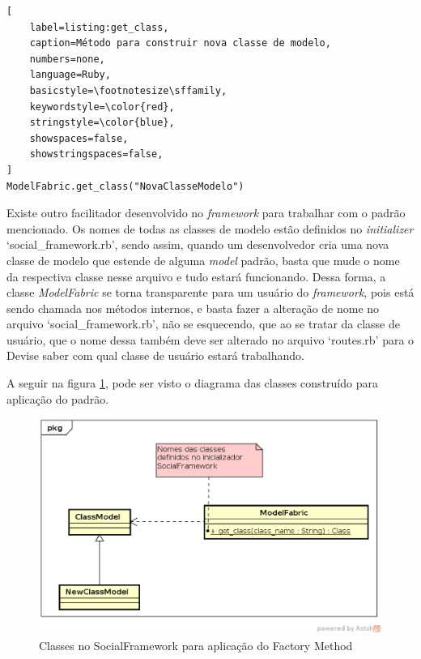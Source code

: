 \begin{lstlisting}[
    label=listing:get_class,
    caption=Método para construir nova classe de modelo,
    numbers=none,
    language=Ruby,
    basicstyle=\footnotesize\sffamily,
    keywordstyle=\color{red},
    stringstyle=\color{blue},
    showspaces=false,
    showstringspaces=false,
]
ModelFabric.get_class("NovaClasseModelo")
\end{lstlisting}

Existe outro facilitador desenvolvido no \textit{framework} para trabalhar com o padrão mencionado. Os nomes de todas as classes de modelo estão definidos no \textit{initializer} `social\_framework.rb', sendo assim, quando um desenvolvedor cria uma nova classe de modelo que estende de alguma \textit{model} padrão, basta que mude o nome da respectiva classe nesse arquivo e tudo estará funcionando. Dessa forma, a classe \textit{ModelFabric} se torna transparente para um usuário do \textit{framework}, pois está sendo chamada nos métodos internos, e basta fazer a alteração de nome no arquivo `social\_framework.rb', não se esquecendo, que ao se tratar da classe de usuário, que o nome dessa também deve ser alterado no arquivo `routes.rb' para o Devise saber com qual classe de usuário estará trabalhando.

A seguir na figura \ref{padrao_factory_method}, pode ser visto o diagrama das classes construído para aplicação do padrão.

\newpage
\begin{figure}[h]
    \centering
    \includegraphics[scale=0.6]{figuras/social_framework/factory_method.eps}
    \caption{Classes no SocialFramework para aplicação do Factory Method}
    \label{padrao_factory_method}
\end{figure}

